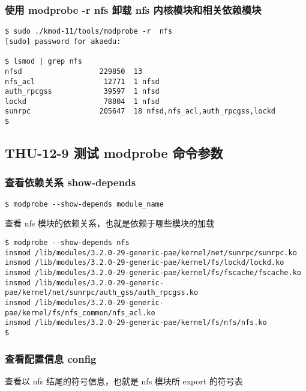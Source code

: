 \documentclass[11pt,a4paper]{article}
\begin{document}
\subsubsection{使用 modprobe -r nfs 卸载 nfs 内核模块和相关依赖模块}

{\begin{shaded}\begin{verbatim}
$ sudo ./kmod-11/tools/modprobe -r  nfs
[sudo] password for akaedu: 

$ lsmod | grep nfs
nfsd                  229850  13 
nfs_acl                12771  1 nfsd
auth_rpcgss            39597  1 nfsd
lockd                  78804  1 nfsd
sunrpc                205647  18 nfsd,nfs_acl,auth_rpcgss,lockd
$ 
\end{verbatim}\end{shaded}}
\subsection{THU-12-9 测试 modprobe 命令参数}

\subsubsection{查看依赖关系 show-depends}

{\begin{shaded}\begin{verbatim}
$ modprobe --show-depends module_name
\end{verbatim}\end{shaded}}
查看 nfs 模块的依赖关系，也就是依赖于哪些模块的加载

{\begin{shaded}\begin{verbatim}
$ modprobe --show-depends nfs
insmod /lib/modules/3.2.0-29-generic-pae/kernel/net/sunrpc/sunrpc.ko 
insmod /lib/modules/3.2.0-29-generic-pae/kernel/fs/lockd/lockd.ko 
insmod /lib/modules/3.2.0-29-generic-pae/kernel/fs/fscache/fscache.ko 
insmod /lib/modules/3.2.0-29-generic-pae/kernel/net/sunrpc/auth_gss/auth_rpcgss.ko 
insmod /lib/modules/3.2.0-29-generic-pae/kernel/fs/nfs_common/nfs_acl.ko 
insmod /lib/modules/3.2.0-29-generic-pae/kernel/fs/nfs/nfs.ko 
$ 
\end{verbatim}\end{shaded}}
\subsubsection{查看配置信息 config}

查看以 nfs 结尾的符号信息，也就是 nfs 模块所 export 的符号表
\end{document}
